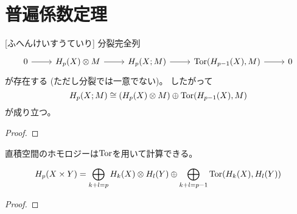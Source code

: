 \documentclass[report]{jlreq}
\begin{document}
%
\section{普遍係数定理}

\begin{definition}
    \TODO{}
\end{definition}

\begin{theorem}[普遍係数定理]
    [ふへんけいすうていり]
    分裂完全列
    \begin{equation}
        \begin{tikzcd}
            0
                \ar{r}
                & H_p(X) \otimes M
                    \ar{r}
                & H_p(X; M)
                    \ar{r}
                & \Tor(H_{p - 1}(X), M)
                    \ar{r}
                & 0
        \end{tikzcd}
    \end{equation}
    が存在する (ただし分裂では一意でない)。
    したがって
    \begin{equation}
        H_p(X; M) \cong (H_p(X) \otimes M) \oplus \operatorname{Tor}(H_{p - 1}(X), M)
    \end{equation}
    が成り立つ。
\end{theorem}

\begin{proof}
    \TODO{}
\end{proof}

\begin{definition}[自由分解]
    \TODO{}
\end{definition}

直積空間のホモロジーは$\operatorname{Tor}$を用いて計算できる。

\begin{theorem}
    \begin{equation}
        H_p(X \times Y)
            = \bigoplus_{k + l = p} H_k(X) \otimes H_l(Y)
            \oplus \bigoplus_{k + l = p - 1} \operatorname{Tor}(H_k(X), H_l(Y))
    \end{equation}
    \TODO{}
\end{theorem}

\begin{proof}
    \TODO{}
\end{proof}
\end{document}
